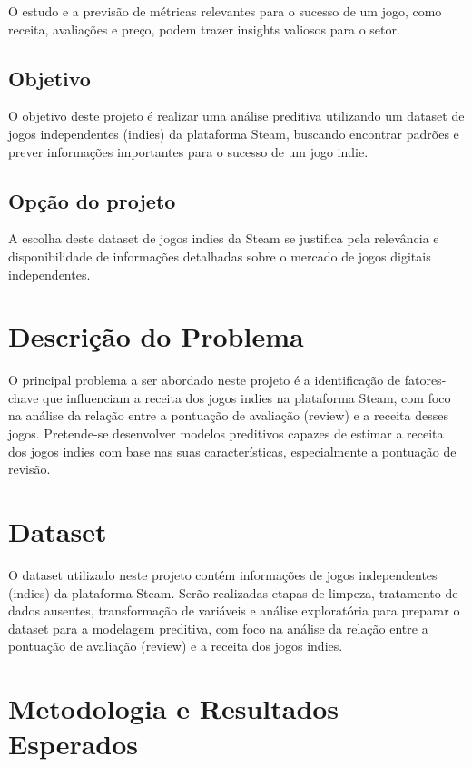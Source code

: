 \documentclass[12pt]{article}
\begin{document}
O estudo e a previsão de métricas relevantes para o sucesso de um jogo, como receita, 
avaliações e preço, podem trazer insights valiosos para o setor.

\subsection{Objetivo}

O objetivo deste projeto é realizar uma análise preditiva utilizando um dataset de jogos 
independentes (indies) da plataforma Steam, buscando encontrar padrões e prever informações 
importantes para o sucesso de um jogo indie.

\subsection{Opção do projeto}

A escolha deste dataset de jogos indies da Steam se justifica pela relevância e 
disponibilidade de informações detalhadas sobre o mercado de jogos digitais independentes.

\section{Descrição do Problema}

O principal problema a ser abordado neste projeto é a identificação de fatores-chave que 
influenciam a receita dos jogos indies na plataforma Steam, com foco na análise da relação 
entre a pontuação de avaliação (review) e a receita desses jogos. Pretende-se desenvolver 
modelos preditivos capazes de estimar a receita dos jogos indies com base nas suas 
características, especialmente a pontuação de revisão.

\section{Dataset}

O dataset utilizado neste projeto contém informações de jogos independentes (indies) da 
plataforma Steam. Serão realizadas etapas de limpeza, tratamento de dados ausentes, 
transformação de variáveis e análise exploratória para preparar o dataset para a modelagem 
preditiva, com foco na análise da relação entre a pontuação de avaliação (review) e a 
receita dos jogos indies.

\section{Metodologia e Resultados Esperados}
\end{document}
